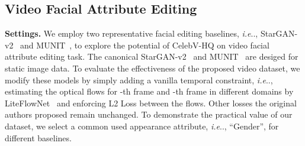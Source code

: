 \documentclass[runningheads]{llncs}
\makeatletter
\DeclareRobustCommand\onedot{\futurelet\@let@token\@onedot}
\def\@onedot{\ifx\@let@token.\else.\null\fi\xspace}
\def\ie{\emph{i.e}\onedot} \def\Ie{\emph{I.e}\onedot}
\makeatother
\begin{document}
\begin{table}[t]
\vspace{-2mm}
\caption{\textbf{Quantitative results of video facial attribute editing.} We evaluate two video facial editing baselines. The ``Video'' version achieves lower FVD scores and comparable FID performance than ``Original''. ``'' means a lower value is better.}
\centering
{}
\label{tbl:i2i}
\vspace{-5mm}
\end{table}

\subsection{Video Facial Attribute Editing}
\noindent
\textbf{Settings.}
We employ two representative facial editing baselines, \ie, StarGAN-v2~\cite{starganv2} and MUNIT~\cite{munit}, to explore the potential of CelebV-HQ on video facial attribute editing task.
The canonical StarGAN-v2~\cite{starganv2} and MUNIT~\cite{munit} are desiged for static image data. To evaluate the effectiveness of the proposed video dataset, we modify these models by simply adding a vanilla temporal constraint, \ie, estimating the optical flows for -th frame and -th frame in different domains by LiteFlowNet~\cite{hui20liteflownet3} and enforcing L2 Loss between the flows. Other losses the original authors proposed remain unchanged.
To demonstrate the practical value of our dataset, we select a common used appearance attribute, \ie, ``Gender'', for different baselines. 
\end{document}
